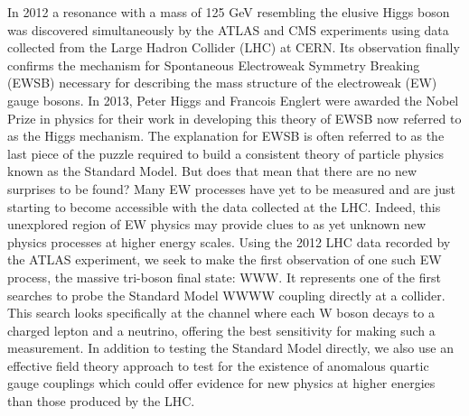 \begin{abstractpage}
In 2012 a resonance with a mass of 125 GeV resembling the elusive Higgs boson was discovered simultaneously by the ATLAS and CMS experiments using data collected from the Large Hadron Collider (LHC) at CERN.  Its observation finally confirms the mechanism for Spontaneous Electroweak Symmetry Breaking (EWSB) necessary for describing the mass structure  of the electroweak (EW) gauge bosons.  In 2013, Peter Higgs and Francois Englert were awarded the Nobel Prize in physics for their work in developing this theory of EWSB now referred to as the Higgs mechanism.  The explanation for EWSB is often referred to as the last piece of the puzzle required to build a consistent theory of particle physics known as the Standard Model.  But does that mean that there are no new surprises to be found?  Many EW processes have yet to be measured and are just starting to become accessible with the data collected at the LHC.  Indeed, this unexplored region of EW physics may provide clues to as yet unknown new physics processes at higher energy scales.  Using the 2012 LHC data recorded by the ATLAS experiment, we seek to make the first observation of one such EW process, the massive tri-boson final state: WWW.  It represents one of the first searches to probe the Standard Model WWWW coupling directly at a collider.  This search looks specifically at the channel where each W boson decays to a charged lepton and a neutrino, offering the best sensitivity for making such a measurement.  In addition to testing the Standard Model directly, we also use an effective field theory approach to test for the existence of anomalous quartic gauge couplings which could offer evidence for new physics at higher energies than those produced by the LHC.
\end{abstractpage}
